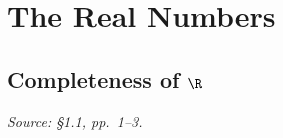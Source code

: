 
\section{The Real Numbers}

\subsection{Completeness of \texorpdfstring{\(\R\)}{R}}
\textit{Source: \S1.1, pp.~1--3.}

